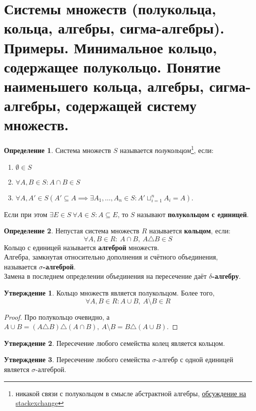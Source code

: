\documentclass[11pt,a4paper]{report}
\theoremstyle{definition}
\theoremstyle{definition}
\newtheorem{preposition}{Утверждение}[section]
\theoremstyle{definition}
\newtheorem{definition}{Определение}[section]
\begin{document}
	\section{Системы множеств (полукольца, кольца, алгебры, сигма-алгебры). Примеры. Минимальное кольцо, содержащее полукольцо. Понятие наименьшего кольца, алгебры, сигма-алгебры, содержащей систему множеств.}
	\begin{definition}
		Система множеств $ S $ называется \textit{полукольцом}\footnote{никакой связи с полукольцом в смысле абстрактной алгебры, \href{https://math.stackexchange.com/questions/1864972/relation-between-semiring-of-sets-and-semiring-in-abstract-algebra}{обсуждение на stackexchange}}, если:
		\begin{enumerate}
			\item $ \emptyset \in S $
			\item $ \forall A, B \in S: A \cap B \in S $
			\item $ \forall A, A' \in S (A' \subseteq A \implies \exists A_{1}, \dots, A_{n} \in S: A' \sqcup_{i=1}^{n} A_{i} = A) $.
		\end{enumerate}
		Если при этом $ \exists E \in S\ \forall A \in S: A \subseteq E $, то $ S $ называют \textbf{полукольцом с единицей}.
	\end{definition}
	\begin{definition}
		Непустая система множеств $ R $ называется \textbf{кольцом}, если: 
		\[ \forall A, B \in R:\ A \cap B,\ A \triangle B \in S \]
		 Кольцо с единицей называется \textbf{алгеброй} множеств.\\ 
		 Алгебра, замкнутая относительно дополнения и счётного объединения, называется \textbf{$ \sigma $-алгеброй}.\\
		 Замена в последнем определении объединения на пересечение даёт \textbf{$ \delta $-алгебру}.
	\end{definition}
	\begin{preposition}
		Кольцо множеств является полукольцом. Более того, 
		\[ \forall A, B \in R: A \cup B,\ A \setminus B \in R \]
	\begin{proof}
		Про полукольцо очевидно, а $ A \cup B = (A \triangle B) \triangle (A \cap B),\ A \setminus B = B \triangle (A \cup B) $.
	\end{proof}
	\end{preposition}
	\begin{preposition}
		Пересечение любого семейства колец является кольцом.
	\end{preposition}
	\begin{preposition}
		 Пересечение любого семейства $ \sigma $-алгебр с одной единицей является $ \sigma $-алгеброй.
	\end{preposition}
\end{document}

